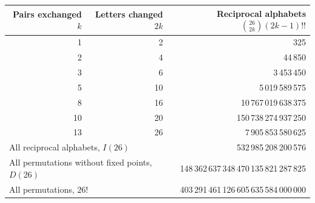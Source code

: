 \begin{tabular}{rrr}
\toprule
Pairs exchanged $k$ & Letters changed $2k$ & Reciprocal alphabets $\binom{26}{2k}(2k-1)!!$\\
\midrule
1 & 2 & 325\\
2 & 4 & 44\,850\\
3 & 6 & 3\,453\,450\\
5 & 10 & 5\,019\,589\,575\\
8 & 16 & 10\,767\,019\,638\,375\\
10 & 20 & 150\,738\,274\,937\,250\\
13 & 26 & 7\,905\,853\,580\,625\\
\midrule
\multicolumn{2}{l}{All reciprocal alphabets, $I(26)$} & 532\,985\,208\,200\,576\\
\multicolumn{2}{l}{All permutations without fixed points, $D(26)$} & 148\,362\,637\,348\,470\,135\,821\,287\,825\\
\multicolumn{2}{l}{All permutations, $26!$} & 403\,291\,461\,126\,605\,635\,584\,000\,000\\
\bottomrule
\end{tabular}
